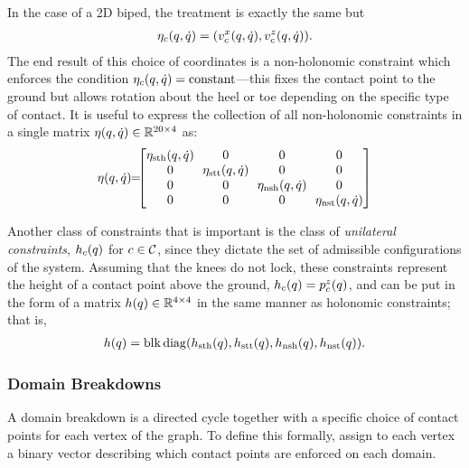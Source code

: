 %
%
In the case of a 2D biped, the treatment is exactly the same but
\begin{align*}
  \eta_{c}(q, \dot{q}) = (v_{c}^{x}(q, \dot{q}), v_{c}^{z}(q, \dot{q})).
\end{align*}
%
The end result of this choice of coordinates is a non-holonomic constraint which
enforces the condition $\eta_{c}(q, \dot{q}) = \mathrm{constant}$---this fixes the
contact point to the ground but allows rotation about the heel or toe depending
on the specific type of contact.
%
It is useful to express the collection of all non-holonomic constraints in a
single matrix $\eta(q, \dot{q}) \in \mathbb{R}^{20 \times 4}$ as:
\begin{align*}
  \eta\argsqdq \!\! = \!\!\! \left[\!\!\begin{array}{c c c c}
    \! \eta_{\sth}\argsqdq \! & 0 & 0 & 0 \\
    0 & \! \eta_{\stt}\argsqdq \! & 0 & 0 \\
    0 & 0 & \! \eta_{\nsh}\argsqdq \! & 0 \\
    0 & 0 & 0 & \! \eta_{\nst}\argsqdq \!
    \end{array}\!\!\right]
\end{align*}

Another class of constraints that is important is the class of {\em unilateral
  constraints}, $h_{c}(q)$ for $c \in \mathcal{C}$, since they dictate the set of
admissible configurations of the system.
%
Assuming that the knees do not lock, these constraints represent the height of a
contact point above the ground, $h_{c}(q) = p_{c}^{z}(q)$, and can be put
in the form of a matrix $h(q) \in \mathbb{R}^{4 \times 4}$ in the same manner as
holonomic constraints;
%
that is,
\begin{align*}
  h(q) = \operatorname*{blk\,diag}(h_{\mathrm{sth}}(q), h_{\mathrm{stt}}(q), h_{\mathrm{nsh}}(q),
  h_{\mathrm{nst}}(q)).
\end{align*}



\subsubsection{Domain Breakdowns}

A domain breakdown is a directed cycle together with a specific choice of
contact points for each vertex of the graph.
%
To define this formally, assign to each vertex a binary vector describing which
contact points are enforced on each domain.

